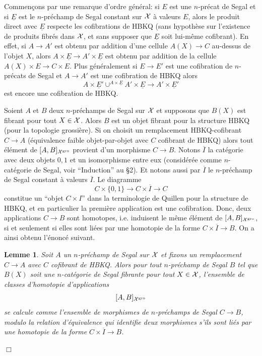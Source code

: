 \documentclass[12pt]{article}
\newcommand{\eop}{\hfill $\Box$\vspace{.1in}}
\newtheorem{lemme}[lemma]{Lemme}
\newcommand{\Xx}{{\cal X}}
\begin{document}
Commen\c{c}ons par une remarque d'ordre g\'en\'eral: si $E$ est une
$n$-pr\'ecat de Segal et si $\underline{E}$ est le $n$-pr\'echamp de Segal
constant
sur $\Xx$ \`a valeurs $E$, alors le produit direct avec $\underline{E}$
respecte les cofibrations de HBKQ (sans hypoth\`ese sur l'existence de produits
fibr\'es dans $\Xx$, et sans supposer que $\underline{E}$ soit lui-m\^eme
cofibrant). En effet, si $A\rightarrow A'$ est obtenu par addition d'une
cellule $A(X)\rightarrow C$ au-dessus de l'objet $X$, alors
$A\times \underline{E}\rightarrow A'\times \underline{E}$ est obtenu par
addition de la cellule $A(X)\times E \rightarrow C\times E$. Plus
g\'en\'eralement si $E\rightarrow E'$ est une cofibration de $n$-pr\'ecats de
Segal et $A\rightarrow A'$ est une cofibration de HBKQ alors
$$
A\times \underline{E}' \cup ^{A\times \underline{E}}A'\times \underline{E}
\rightarrow A'\times \underline{E}'
$$
est encore une cofibration de HBKQ.

Soient $A$ et $B$ deux
$n$-pr\'echamps de Segal sur $\Xx$ et supposons que
$B(X)$ est fibrant pour tout $X\in \Xx$. Alors $B$ est un objet fibrant pour la
structure HBKQ (pour la topologie grossi\`ere). Si on choisit un remplacement
HBKQ-cofibrant $C\rightarrow A$ (\'equivalence faible objet-par-objet avec
$C$ cofibrant de HBKQ) alors tout \'el\'ement de $[A,B]_{\Xx ^{\rm gro}}$
provient d'un morphisme $C\rightarrow B$. Notons $\overline{I}$ la
cat\'egorie avec deux objets $0,1$ et un isomorphisme entre eux
(consid\'er\'ee comme $n$-cat\'egorie de Segal, voir ``Induction'' au \S 2).
Et notons aussi par $\overline{I}$ le
$n$-pr\'echamp de Segal constant \`a valeurs $\overline{I}$.  Le diagramme
$$
C\times \{ 0,1\} \rightarrow C\times \overline{I}\rightarrow C
$$
constitue un ``objet $C\times I$'' dans la terminologie de Quillen
\cite{Quillen} pour la structure de HBKQ, et en particulier la premi\`ere
application
est une cofibration. Donc, deux applications $C\rightarrow B$ sont homotopes,
i.e. induisent le m\^eme \'el\'ement de $[A,B]_{\Xx ^{\rm gro}}$, si et
seulement si elles sont li\'ees par une homotopie de la forme $C\times
\overline{I}\rightarrow B$. On a ainsi obtenu l'\'enonc\'e suivant.

\begin{lemme}
\label{howtocalc}
Soit $A$ un $n$-pr\'echamp de Segal sur $\Xx$ et fixons un remplacement
$C\rightarrow A$ avec $C$ cofibrant
de HBKQ. Alors pour tout $n$-pr\'echamp de Segal $B$ tel que
$B(X)$ soit une $n$-cat\'egorie de Segal fibrante pour tout $X\in \Xx$,
l'ensemble de classes d'homotopie d'applications
$$
[A,B]_{\Xx ^{\rm gro}}
$$
se calcule comme l'ensemble de  morphismes
de $n$-pr\'echamps de Segal $C\rightarrow B$, modulo la relation d'\'equivalence
qui identifie deux morphismes s'ils sont li\'es par une homotopie de
la forme $C\times \overline{I}\rightarrow B$.
\end{lemme}
\eop
\end{document}
